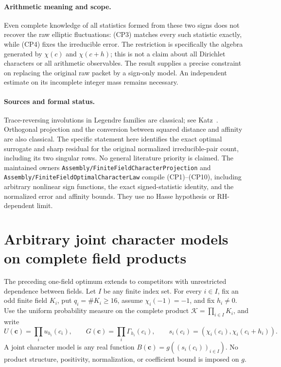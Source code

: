 \documentclass[11pt]{article}
\begin{document}
\paragraph{Arithmetic meaning and scope.}
Even complete knowledge of all statistics formed from these two signs
does not recover the raw elliptic fluctuations: (CP3) matches every
such statistic exactly, while (CP4) fixes the irreducible error.
The restriction is specifically the algebra generated by
\(\chi(c)\) and \(\chi(c+h)\); this is not a claim about all Dirichlet
characters or all arithmetic observables. The result supplies a precise
constraint on replacing the original raw packet by a sign-only model.
An independent estimate on its incomplete integer mass remains necessary.

\paragraph{Sources and formal status.}
Trace-reversing involutions in Legendre families are classical; see
Katz~\cite[Lemma~2.3]{KatzTraceRatios}. Orthogonal projection and the
conversion between squared distance and affinity are also classical.
The specific statement here identifies the exact optimal surrogate and
sharp residual for the original normalized irreducible-pair count,
including its two singular rows. No general literature priority is claimed.
The maintained owners \texttt{Assembly/FiniteFieldCharacterProjection}
and \texttt{Assembly/FiniteFieldOptimalCharacterLaw} compile
(CP1)--(CP10), including arbitrary nonlinear sign functions, the exact
signed-statistic identity, and the normalized error and affinity bounds.
They use no Hasse hypothesis or RH-dependent limit.

\section{Arbitrary joint character models on complete field products}
\label{sec:joint-character-projection}
The preceding one-field optimum extends to competitors with unrestricted
dependence between fields. Let \(I\) be any finite index set. For every
\(i\in I\), fix an odd finite field \(K_i\), put \(q_i=\#K_i\ge16\),
assume \(\chi_i(-1)=-1\), and fix \(h_i\ne0\).
Use the uniform probability measure on the complete product
\(\mathcal K=\prod_{i\in I}K_i\), and write
\[
 U(\mathbf c)=\prod_i u_{h_i}(c_i),\qquad
 G(\mathbf c)=\prod_i\Gamma_{h_i}(c_i),\qquad
 s_i(c_i)=(\chi_i(c_i),\chi_i(c_i+h_i)).
\]
A joint character model is any real function
\(B(\mathbf c)=g((s_i(c_i))_{i\in I})\).
No product structure, positivity, normalization, or coefficient bound is
imposed on \(g\).
\end{document}
